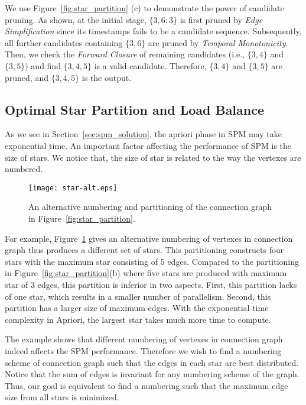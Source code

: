 \begin{example}
We use Figure~\ref{fig:star_partition} (c) to 
demonstrate the power of candidate pruning. 
As shown, at the initial stage, $\{3,6:3\}$ is first pruned by \textit{Edge Simplification} since its
timestamps fails to be a candidate sequence. Subsequently, all further candidates containing $\{3,6\}$ 
are pruned by \textit{Temporal Monotonicity}. Then, we check the \textit{Forward Closure} 
of remaining candidates (i.e., $\{3,4\}$ and $\{3,5\}$) and find $\{3,4,5\}$ is a
valid candidate. Therefore, $\{3,4\}$ and $\{3,5\}$ are pruned, and $\{3,4,5\}$ is the output.
\end{example}
%

\subsection{Optimal Star Partition and Load Balance}
As we see in Section~\ref{sec:spm_solution}, the apriori phase in SPM may
take exponential time. An important factor affecting the performance of
SPM is the size of stars. We notice that, the
size of star is related to the way the vertexes are numbered. 

\begin{figure}[h]
\centering
\texttt{[image: star-alt.eps]}
\caption{An alternative numbering and partitioning of the connection graph in Figure~\ref{fig:star_partition}.}
\label{fig:star-alt}
\end{figure}

For example,
Figure~\ref{fig:star-alt} gives an alternative numbering of vertexes 
in connection graph thus produces a different set of stars. This partitioning constructs
four stars with the maximum star consisting of 5 edges. Compared to the partitioning
in Figure~\ref{fig:star_partition}(b) where five stars are produced with maximum star of 3 edges, this
partition is inferior in two aspects. First, this partition lacks of one star, which
results in a smaller number of parallelism. Second, this partition has a larger size
of maximum edges. With the exponential time complexity in Apriori, the largest star takes
much more time to compute.

The example shows that different numbering of vertexes in connection graph indeed affects
the SPM performance. Therefore we wish to find a numbering scheme of connection graph
such that the edges in each star are best distributed. Notice that the sum of edges 
is invariant for any numbering scheme of the graph. Thus, our goal is equivalent to find
a numbering such that the maximum edge size from all stars is minimized. 


